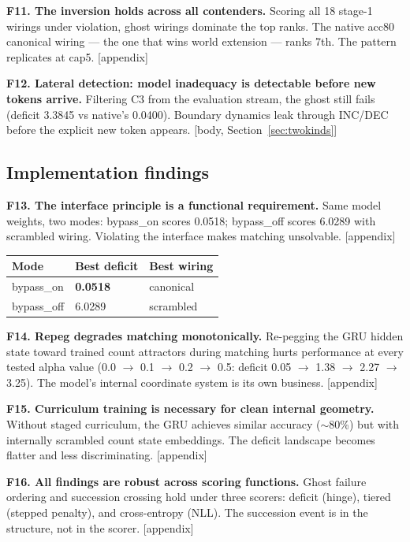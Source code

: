 \documentclass[12pt, a4paper]{article}
\begin{document}
\medskip
\noindent\textbf{F11. The inversion holds across all contenders.}
Scoring all 18 stage-1 wirings under violation, ghost wirings dominate the top
ranks. The native acc80 canonical wiring --- the one that wins world extension
--- ranks 7th. The pattern replicates at cap5. [appendix]

\medskip
\noindent\textbf{F12. Lateral detection: model inadequacy is detectable before
new tokens arrive.}
Filtering C3 from the evaluation stream, the ghost still fails (deficit 3.3845
vs native's 0.0400). Boundary dynamics leak through INC/DEC before the
explicit new token appears. [body, Section~\ref{sec:twokinds}]

\subsection*{Implementation findings}

\noindent\textbf{F13. The interface principle is a functional requirement.}
Same model weights, two modes: bypass\_on scores 0.0518; bypass\_off scores
6.0289 with scrambled wiring. Violating the interface makes matching
unsolvable. [appendix]

\begin{center}
\begin{tabular}{lll}
\toprule
Mode & Best deficit & Best wiring \\
\midrule
bypass\_on  & \textbf{0.0518} & canonical \\
bypass\_off & 6.0289          & scrambled \\
\bottomrule
\end{tabular}
\end{center}

\medskip
\noindent\textbf{F14. Repeg degrades matching monotonically.}
Re-pegging the GRU hidden state toward trained count attractors during matching
hurts performance at every tested alpha value (0.0 $\to$ 0.1 $\to$ 0.2 $\to$
0.5: deficit 0.05 $\to$ 1.38 $\to$ 2.27 $\to$ 3.25). The model's internal
coordinate system is its own business. [appendix]

\medskip
\noindent\textbf{F15. Curriculum training is necessary for clean internal
geometry.}
Without staged curriculum, the GRU achieves similar accuracy ($\sim$80\%) but
with internally scrambled count state embeddings. The deficit landscape becomes
flatter and less discriminating. [appendix]

\medskip
\noindent\textbf{F16. All findings are robust across scoring functions.}
Ghost failure ordering and succession crossing hold under three scorers: deficit
(hinge), tiered (stepped penalty), and cross-entropy (NLL). The succession
event is in the structure, not in the scorer. [appendix]
\end{document}
